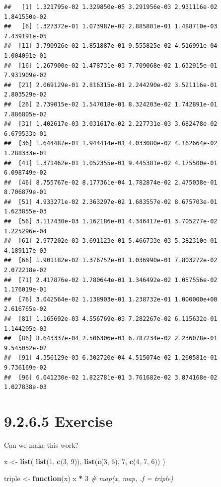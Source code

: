 \documentclass[]{book}
\newenvironment{Shaded}{\begin{snugshade}}{\end{snugshade}}
\newcommand{\CommentTok}[1]{\textcolor[rgb]{0.56,0.35,0.01}{\textit{#1}}}
\newcommand{\ControlFlowTok}[1]{\textcolor[rgb]{0.13,0.29,0.53}{\textbf{#1}}}
\newcommand{\DecValTok}[1]{\textcolor[rgb]{0.00,0.00,0.81}{#1}}
\newcommand{\KeywordTok}[1]{\textcolor[rgb]{0.13,0.29,0.53}{\textbf{#1}}}
\newcommand{\NormalTok}[1]{#1}
\newcommand{\OperatorTok}[1]{\textcolor[rgb]{0.81,0.36,0.00}{\textbf{#1}}}
\newcommand{\StringTok}[1]{\textcolor[rgb]{0.31,0.60,0.02}{#1}}
\begin{document}
\begin{verbatim}
##   [1] 1.321795e-02 1.329850e-05 3.291956e-03 2.931116e-02 1.841550e-02
##   [6] 1.327372e-01 1.073987e-02 2.885801e-01 1.488710e-03 7.439191e-05
##  [11] 3.790926e-02 1.851887e-01 9.555825e-02 4.516991e-04 1.004091e-01
##  [16] 1.267900e-02 1.478731e-03 7.709068e-02 1.632915e-01 7.931909e-02
##  [21] 2.069129e-01 2.816315e-01 2.244290e-02 3.521116e-01 2.803529e-02
##  [26] 2.739015e-02 1.547018e-01 8.324203e-02 1.742891e-01 7.886805e-02
##  [31] 1.402617e-03 3.031617e-02 2.227731e-03 3.682478e-02 6.679533e-01
##  [36] 1.644487e-01 1.944414e-01 4.033080e-02 4.162664e-02 1.288333e-01
##  [41] 1.371462e-01 1.052355e-01 9.445381e-02 4.175500e-01 6.098749e-02
##  [46] 8.755767e-02 8.177361e-04 1.782874e-02 2.475038e-01 8.706879e-01
##  [51] 4.933271e-02 2.363297e-02 1.683557e-02 8.675703e-01 1.623855e-03
##  [56] 3.117430e-03 1.162186e-01 4.346417e-01 3.705277e-02 1.225296e-04
##  [61] 2.977202e-03 3.691123e-01 5.466733e-03 5.382310e-01 4.189117e-03
##  [66] 1.901182e-02 1.376752e-01 1.036990e-01 7.803272e-02 2.072218e-02
##  [71] 2.417876e-02 1.780644e-01 1.346492e-02 1.057556e-02 1.176019e-01
##  [76] 3.042564e-02 1.138903e-01 1.238732e-01 1.000000e+00 2.616765e-02
##  [81] 1.165692e-03 4.556769e-03 7.282267e-02 6.115632e-01 1.144205e-03
##  [86] 8.643337e-04 2.506306e-01 6.787234e-02 2.236078e-01 9.545052e-02
##  [91] 4.356129e-03 6.302720e-04 4.515074e-02 1.260581e-01 9.736169e-02
##  [96] 6.041230e-02 1.822781e-01 3.761682e-02 3.874168e-02 1.027838e-03
\end{verbatim}

\hypertarget{exercise-9}{%
\section*{9.2.6.5 Exercise}\label{exercise-9}}

Can we make this work?

\begin{Shaded}
\begin{Highlighting}[]
\NormalTok{x <-}\StringTok{ }\KeywordTok{list}\NormalTok{(}
  \KeywordTok{list}\NormalTok{(}\DecValTok{1}\NormalTok{, }\KeywordTok{c}\NormalTok{(}\DecValTok{3}\NormalTok{, }\DecValTok{9}\NormalTok{)),}
  \KeywordTok{list}\NormalTok{(}\KeywordTok{c}\NormalTok{(}\DecValTok{3}\NormalTok{, }\DecValTok{6}\NormalTok{), }\DecValTok{7}\NormalTok{, }\KeywordTok{c}\NormalTok{(}\DecValTok{4}\NormalTok{, }\DecValTok{7}\NormalTok{, }\DecValTok{6}\NormalTok{))}
\NormalTok{)}

\NormalTok{triple <-}\StringTok{ }\ControlFlowTok{function}\NormalTok{(x) x }\OperatorTok{*}\StringTok{ }\DecValTok{3}
\CommentTok{# map(x, map, .f = triple)}
\end{Highlighting}
\end{Shaded}
\end{document}
